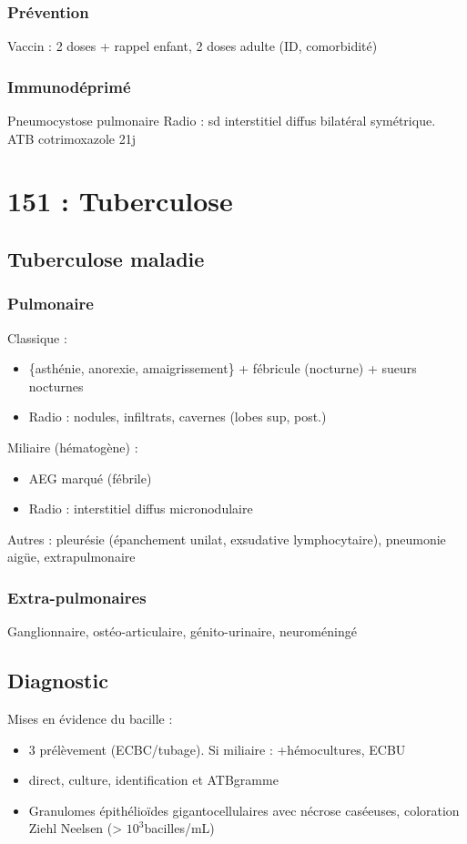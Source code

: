 \documentclass{article}
\begin{document}
\subsubsection{Prévention}
Vaccin : 2 doses + rappel enfant, 2 doses adulte (ID, comorbidité)

\subsubsection{Immunodéprimé}
Pneumocystose pulmonaire
Radio : sd interstitiel diffus bilatéral symétrique. ATB cotrimoxazole 21j


\section{151 : Tuberculose}
\subsection{Tuberculose maladie}
\subsubsection{Pulmonaire}
Classique : 
\begin{itemize}
\item \{asthénie, anorexie, amaigrissement\} + fébricule (nocturne) + sueurs nocturnes
\item Radio : nodules, infiltrats, cavernes (lobes sup, post.)
\end{itemize}
Miliaire (hématogène) :
\begin{itemize}
\item AEG marqué (fébrile)
\item Radio : interstitiel diffus micronodulaire
\end{itemize}
Autres : pleurésie (épanchement unilat, exsudative lymphocytaire), pneumonie
aigüe, extrapulmonaire
\subsubsection{Extra-pulmonaires}
Ganglionnaire, ostéo-articulaire, génito-urinaire, neuroméningé
\subsection{Diagnostic}
Mises en évidence du bacille :
\begin{itemize}
\item 3 prélèvement (ECBC/tubage). Si miliaire : +hémocultures, ECBU
\item direct, culture, identification et ATBgramme
\item Granulomes épithélioïdes gigantocellulaires avec nécrose caséeuses,
  coloration Ziehl Neelsen (> $10^3$bacilles/mL)
\end{itemize}
\end{document}
